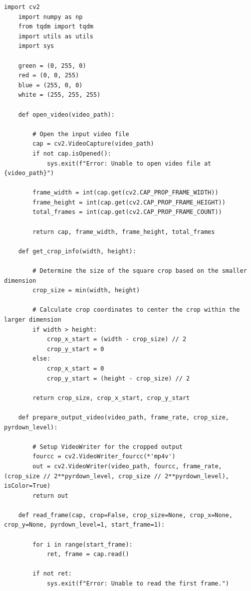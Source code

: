 \documentclass[11pt, conference, letterpaper]{IEEEtran}
\begin{document}
\begin{lstlisting}[style=python, caption={\texttt{video\_utils.py}}, label={lst:vutils}]
    import cv2
    import numpy as np
    from tqdm import tqdm
    import utils as utils
    import sys
    
    green = (0, 255, 0)
    red = (0, 0, 255)
    blue = (255, 0, 0)
    white = (255, 255, 255)
    
    def open_video(video_path):
        
        # Open the input video file
        cap = cv2.VideoCapture(video_path)
        if not cap.isOpened():
            sys.exit(f"Error: Unable to open video file at {video_path}")
    
        frame_width = int(cap.get(cv2.CAP_PROP_FRAME_WIDTH))
        frame_height = int(cap.get(cv2.CAP_PROP_FRAME_HEIGHT))
        total_frames = int(cap.get(cv2.CAP_PROP_FRAME_COUNT))
        
        return cap, frame_width, frame_height, total_frames
    
    def get_crop_info(width, height):
        
        # Determine the size of the square crop based on the smaller dimension
        crop_size = min(width, height)
        
        # Calculate crop coordinates to center the crop within the larger dimension
        if width > height:
            crop_x_start = (width - crop_size) // 2
            crop_y_start = 0
        else:
            crop_x_start = 0
            crop_y_start = (height - crop_size) // 2
            
        return crop_size, crop_x_start, crop_y_start
    
    def prepare_output_video(video_path, frame_rate, crop_size, pyrdown_level):
        
        # Setup VideoWriter for the cropped output
        fourcc = cv2.VideoWriter_fourcc(*'mp4v')
        out = cv2.VideoWriter(video_path, fourcc, frame_rate, (crop_size // 2**pyrdown_level, crop_size // 2**pyrdown_level), isColor=True)
        return out
    
    def read_frame(cap, crop=False, crop_size=None, crop_x=None, crop_y=None, pyrdown_level=1, start_frame=1):
        
        for i in range(start_frame):
            ret, frame = cap.read()
        
        if not ret:
            sys.exit(f"Error: Unable to read the first frame.")
        

\end{lstlisting}
\end{document}
